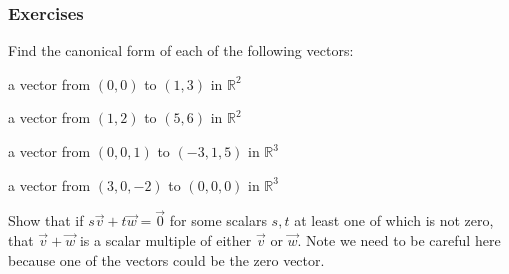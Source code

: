 \subsubsection{Exercises}

\begin{exercise} Find the canonical form of each of the following vectors:\\
\begin{inparaenum}[a)]
\item a vector from $(0,0)$ to $(1,3)$ in $\mathbb{R}^2$\\
\item a vector from $(1,2)$ to $(5,6)$ in $\mathbb{R}^2$\\
\item a vector from $(0,0,1)$ to $(-3,1,5)$ in $\mathbb{R}^3$\\
\item a vector from $(3,0,-2)$ to $(0,0,0)$ in $\mathbb{R}^3$\\
\end{inparaenum}
\end{exercise}

\begin{exercise}\label{exercise:dependent_addition}
Show that if $s\vec{v}+t\vec{w}=\vec{0}$ for some scalars $s,t$ at least one of which is not zero, that $\vec{v}+\vec{w}$ is a scalar multiple of either 
$\vec{v}$ or $\vec{w}$. Note we need to be careful here because one of the 
vectors could be the zero vector.
\end{exercise}

